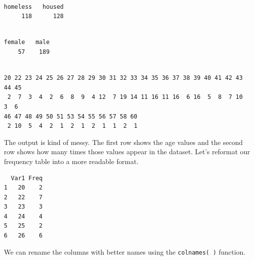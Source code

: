 \documentclass[]{book}
\newenvironment{Shaded}{\begin{snugshade}}{\end{snugshade}}
\newcommand{\CommentTok}[1]{\textcolor[rgb]{0.56,0.35,0.01}{\textit{#1}}}
\newcommand{\KeywordTok}[1]{\textcolor[rgb]{0.13,0.29,0.53}{\textbf{#1}}}
\newcommand{\NormalTok}[1]{#1}
\newcommand{\OperatorTok}[1]{\textcolor[rgb]{0.81,0.36,0.00}{\textbf{#1}}}
\newcommand{\StringTok}[1]{\textcolor[rgb]{0.31,0.60,0.02}{#1}}
\begin{document}
\begin{verbatim}

homeless   housed 
     118      128 
\end{verbatim}

\begin{Shaded}
\end{Shaded}

\begin{verbatim}

female   male 
    57    189 
\end{verbatim}

\begin{Shaded}
\end{Shaded}

\begin{verbatim}

20 22 23 24 25 26 27 28 29 30 31 32 33 34 35 36 37 38 39 40 41 42 43 44 45 
 2  7  3  4  2  6  8  9  4 12  7 19 14 11 16 11 16  6 16  5  8  7 10  3  6 
46 47 48 49 50 51 53 54 55 56 57 58 60 
 2 10  5  4  2  1  2  1  2  1  1  2  1 
\end{verbatim}

The output is kind of messy. The first row shows the age values and the second row shows how many times those values appear in the dataset. Let's reformat our frequency table into a more readable format.

\begin{Shaded}
\end{Shaded}

\begin{verbatim}
  Var1 Freq
1   20    2
2   22    7
3   23    3
4   24    4
5   25    2
6   26    6
\end{verbatim}

We can rename the columns with better names using the \texttt{colnames(\ )} function.
\end{document}
